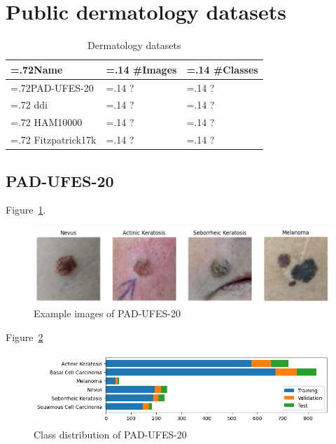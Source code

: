 \section{Public dermatology datasets}
\label{section:derma_datasets}

\begin{table}[H]
\centering
\caption{Dermatology datasets\label{tab:suitable_derma_datasets}}
\begin{tabularx}{\textwidth}{|
    >{\hsize=.72\hsize}X |
    >{\hsize=.14\hsize\raggedleft}X |
    >{\hsize=.14\hsize\raggedleft}X |
}
\hline
\textbf{Name} & \textbf{\#Images} & \textbf{\#Classes} \tabularnewline \hline
PAD-UFES-20 \autocite{hslu} & ? & ? \tabularnewline \hline
\gls{ddi} \autocite{hslu} & ? & ? \tabularnewline \hline
HAM10000 \autocite{hslu} & ? & ? \tabularnewline \hline
Fitzpatrick17k \autocite{hslu} & ? & ? \tabularnewline \hline
\end{tabularx}
\end{table}

\subsection{PAD-UFES-20}
Figure~\ref{fig:example_images_of_pad-ufes-20}.

\begin{figure}[H]
    \begin{center}
    \includegraphics[width=15cm]{../images/example_images_of_pad-ufes-20.png}
    \caption{Example images of PAD-UFES-20}\label{fig:example_images_of_pad-ufes-20}
    \end{center}
\end{figure}

Figure~\ref{fig:class_distribution_of_pad-ufes-20}

\begin{figure}[H]
    \begin{center}
    \includegraphics[width=15cm]{../images/class_distribution_of_pad-ufes-20.png}
    \caption{Class distribution of PAD-UFES-20}\label{fig:class_distribution_of_pad-ufes-20}
    \end{center}
\end{figure}
